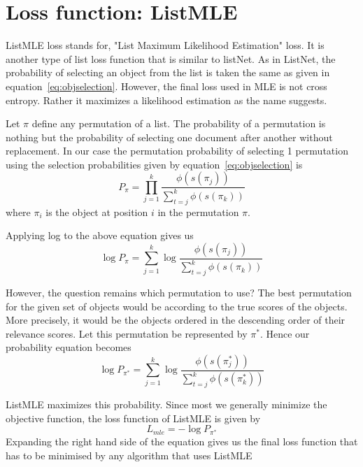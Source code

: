 \documentclass[12pt, twoside, ngerman]{report}
\begin{document}
\fi

\section{Loss function: ListMLE}\label{sec:listMLE}

ListMLE loss stands for, "List Maximum Likelihood Estimation" loss.
It is another type of list loss function that is similar to listNet.
As in ListNet,  the probability of selecting an object from the list is taken the same as given in equation~\ref{eq:objselection}.
However,  the final loss used in MLE is not cross entropy.
Rather it maximizes a likelihood estimation as the name suggests.

Let $\pi$ define any permutation of a list.
The probability of a permutation is nothing but the probability of selecting one document after another without replacement.
In our case the permutation probability of selecting 1 permutation using the selection probabilities given by equation~\ref{eq:objselection}  is~\cite{listwisebetter}
\begin{equation}\label{eq:firstMLEequation}
P_{\pi} = \prod\limits_{j=1}^{k} \frac{\phi(s(\pi_j))}{ \sum\limits_{t=j}^k \phi(s(\pi_k))}
\end{equation}
where $\pi_i$ is the object at position $i$ in the permutation $\pi$.

Applying log to the above equation gives us
\begin{equation}
\log P_{\pi} = \sum\limits_{j=1}^{k} \log \frac{\phi(s(\pi_j))}{ \sum\limits_{t=j}^k \phi(s(\pi_k))}
\end{equation}

However,  the question remains which permutation to use?
The best permutation for the given set of objects would be according to the true scores of the objects.
More precisely,  it would be the objects ordered in the descending order of their relevance scores.
Let this permutation be represented by $\pi^*$.
Hence our probability equation becomes
\begin{equation}
\log P_{\pi^*} = \sum\limits_{j=1}^{k} \log \frac{\phi(s(\pi^*_j))}{ \sum\limits_{t=j}^k \phi(s(\pi^*_k))}
\end{equation}

ListMLE maximizes this probability.
Since most we generally minimize the objective function,  the loss function of ListMLE is given by
\begin{equation}
L_{mle} = - \log P_{\pi^*}
\end{equation}
Expanding the right hand side of the equation gives us the final loss function that has to be minimised by any algorithm that uses ListMLE
\end{document}
